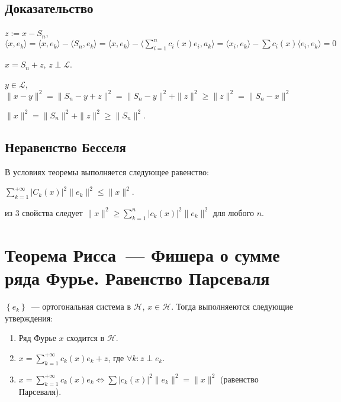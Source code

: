 \documentclass{article}
\begin{document}
        \subsection{Доказательство}
        
            $z := x - S_n$, $\langle x, e_k \rangle = \langle x, e_k \rangle - \langle S_n, e_k \rangle = \langle x, e_k \rangle - \langle \sum\limits_{i = 1}^n c_i(x)e_i, a_k \rangle = \langle x_i, e_k \rangle - \sum c_i(x) \langle e_i, e_k \rangle = 0$
            
            $x = S_n + z$, $z \perp \mathcal{L}$.
            
            $y \in \mathcal{L}$, $\| x - y \|^2 = \| S_n - y + z \|^2 = \| S_n - y \|^2 + \| z \|^2 \geqslant \| z \|^2 = \| S_n - x \|^2$
            
            $\| x \|^2 = \| S_n \|^2 + \| z \|^2 \geqslant \| S_n \|^2$.
            
        \subsection{Неравенство Бесселя}
        
            В условиях теоремы выполняется следующее равенство:
            
            $\sum\limits_{k = 1}^{+\infty} \left| C_k(x) \right|^2 \| e_k \|^2 \leqslant \| x \|^2$.
            
            из 3 свойства следует $\| x \|^2 \geqslant \sum\limits_{k = 1}^n \left| c_k(x) \right|^2 \| e_k \|^2$ для любого $n$.
        
    \newpage
    
    \section{Теорема Рисса~--- Фишера о сумме ряда Фурье. Равенство Парсеваля}
    
        $\left\{ e_k \right\}$~--- ортогональная система в $\mathcal{H}$, $x \in \mathcal{H}$. Тогда выполняеются следующие утверждения:
        
        \begin{enumerate}
        
            \item Ряд Фурье $x$ сходится в $\mathcal{H}$.
            
            \item $x = \sum\limits^{+\infty}_{k = 1} c_k(x) e_k + z$, где $\forall k : z \perp e_k$.
            
            \item $x = \sum\limits_{k = 1}^{+\infty} c_k(x) e_k \Longleftrightarrow \sum \left| c_k(x) \right|^2 \| e_k \|^2 = \| x \|^2$ (равенство Парсеваля).
            
        \end{enumerate}
            
\end{document}
